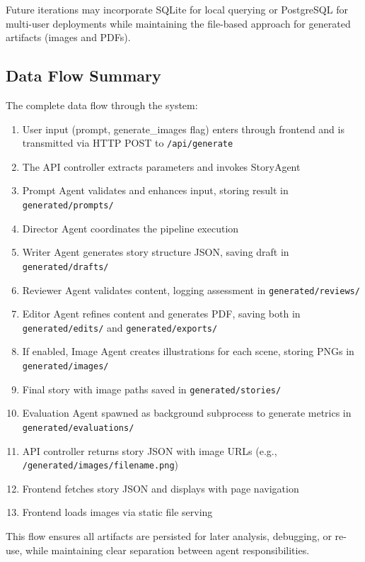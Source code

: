 Future iterations may incorporate SQLite for local querying or PostgreSQL for multi-user deployments while maintaining the file-based approach for generated artifacts (images and PDFs).

\subsection{Data Flow Summary}
The complete data flow through the system:
\begin{enumerate}
    \item User input (prompt, generate\_images flag) enters through frontend and is transmitted via HTTP POST to \texttt{/api/generate}
    \item The API controller extracts parameters and invokes StoryAgent
    \item Prompt Agent validates and enhances input, storing result in \texttt{generated/prompts/}
    \item Director Agent coordinates the pipeline execution
    \item Writer Agent generates story structure JSON, saving draft in \texttt{generated/drafts/}
    \item Reviewer Agent validates content, logging assessment in \texttt{generated/reviews/}
    \item Editor Agent refines content and generates PDF, saving both in \texttt{generated/edits/} and \texttt{generated/exports/}
    \item If enabled, Image Agent creates illustrations for each scene, storing PNGs in \texttt{generated/images/}
    \item Final story with image paths saved in \texttt{generated/stories/}
    \item Evaluation Agent spawned as background subprocess to generate metrics in \texttt{generated/evaluations/}
    \item API controller returns story JSON with image URLs (e.g., \texttt{/generated/images/filename.png})
    \item Frontend fetches story JSON and displays with page navigation
    \item Frontend loads images via static file serving
\end{enumerate}

This flow ensures all artifacts are persisted for later analysis, debugging, or re-use, while maintaining clear separation between agent responsibilities.

\clearpage
